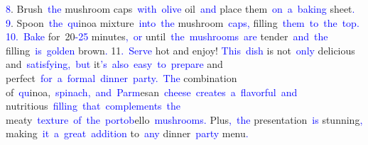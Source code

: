 \documentclass{article}
\begin{document}
\begin{tcolorbox}[colframe=black,colback=white]
{}\textcolor{blue}{8}. Brush\textcolor{blue}{~the} mushroom caps\textcolor{blue}{~with}\textcolor{blue}{~olive} oil\textcolor{blue}{~and} place them\textcolor{blue}{~on}\textcolor{blue}{~a}\textcolor{blue}{~baking} sheet\textcolor{blue}{.
}\textcolor{blue}{9}. Spoon\textcolor{blue}{~the}\textcolor{blue}{~qu}inoa mixture\textcolor{blue}{~into}\textcolor{blue}{~the} mushroom\textcolor{blue}{~caps}\textcolor{blue}{,} filling\textcolor{blue}{~them}\textcolor{blue}{~to}\textcolor{blue}{~the}\textcolor{blue}{~top}\textcolor{blue}{.
}\textcolor{blue}{10}\textcolor{blue}{.}\textcolor{blue}{~Bake} for\textcolor{blue}{~}20\textcolor{blue}{-}\textcolor{blue}{25} minutes\textcolor{blue}{,}\textcolor{blue}{~or} until\textcolor{blue}{~the}\textcolor{blue}{~mushrooms}\textcolor{blue}{~are} tender\textcolor{blue}{~and}\textcolor{blue}{~the} filling\textcolor{blue}{~is}\textcolor{blue}{~golden} brown\textcolor{blue}{.
}11\textcolor{blue}{.}\textcolor{blue}{~Serve} hot and enjoy!
\textcolor{blue}{This}\textcolor{blue}{~dish} is not\textcolor{blue}{~only} delicious and\textcolor{blue}{~satisfying}\textcolor{blue}{,}\textcolor{blue}{~but} it\textcolor{blue}{'s}\textcolor{blue}{~also}\textcolor{blue}{~easy}\textcolor{blue}{~to}\textcolor{blue}{~prepare} and perfect\textcolor{blue}{~for}\textcolor{blue}{~a}\textcolor{blue}{~formal}\textcolor{blue}{~dinner}\textcolor{blue}{~party}\textcolor{blue}{.}\textcolor{blue}{~The} combination of\textcolor{blue}{~qu}inoa,\textcolor{blue}{~spinach}\textcolor{blue}{,}\textcolor{blue}{~and}\textcolor{blue}{~Parm}esan\textcolor{blue}{~cheese}\textcolor{blue}{~creates}\textcolor{blue}{~a}\textcolor{blue}{~flavorful}\textcolor{blue}{~and} nutritious\textcolor{blue}{~filling}\textcolor{blue}{~that}\textcolor{blue}{~comple}\textcolor{blue}{ments}\textcolor{blue}{~the} meaty\textcolor{blue}{~texture}\textcolor{blue}{~of}\textcolor{blue}{~the}\textcolor{blue}{~port}\textcolor{blue}{ob}ello\textcolor{blue}{~mushrooms}\textcolor{blue}{.} Plus\textcolor{blue}{,}\textcolor{blue}{~the} presentation\textcolor{blue}{~is} stunning\textcolor{blue}{,} making\textcolor{blue}{~it}\textcolor{blue}{~a}\textcolor{blue}{~great}\textcolor{blue}{~addition} to\textcolor{blue}{~any} dinner\textcolor{blue}{~party} menu\textcolor{blue}{.}\textcolor{blue}{}
\end{tcolorbox}
\end{document}
